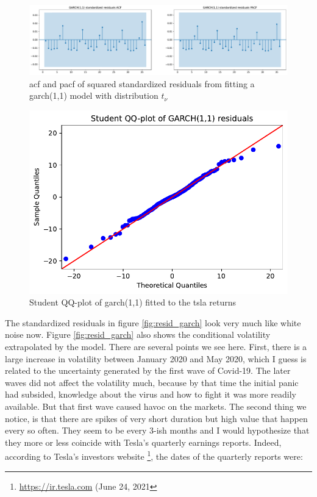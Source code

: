 \begin{figure}
	\centering
	\includegraphics[width=\textwidth]{img/img_acf_garch.pdf}
	\caption{\acrshort{acf} and \acrshort{pacf} of squared standardized residuals from fitting a \acrshort{garch}(1,1) model with distribution $t_{\nu}$}
	\label{fig:acf_sgarch}
\end{figure}

\begin{figure}
	\centering
	\includegraphics[width=\textwidth]{img/img_sqq_garch.pdf}
	\caption{Student QQ-plot of \acrshort{garch}(1,1) fitted to the \acrshort{tsla} returns}
	\label{fig:tqq_garch}
\end{figure}

The standardized residuals in figure \ref{fig:resid_garch} look very much like white noise now. Figure \ref{fig:resid_garch} also shows the conditional volatility extrapolated by the model. There are several points we see here. First, there is a large increase in volatility between January 2020 and May 2020, which I guess is related to the uncertainty generated by the first wave of Covid-19. The later waves did not affect the volatility much, because by that time the initial panic had subsided, knowledge about the virus and how to fight it was more readily available. But that first wave caused havoc on the markets. The second thing we notice, is that there are spikes of very short duration but high value that happen every so often. They seem to be every 3-ish months and I would hypothesize that they more or less coincide with Tesla's quarterly earnings reports.
Indeed, according to Tesla's investors website \footnote{\url{https://ir.tesla.com} (June 24, 2021}, the dates of the quarterly reports were:

